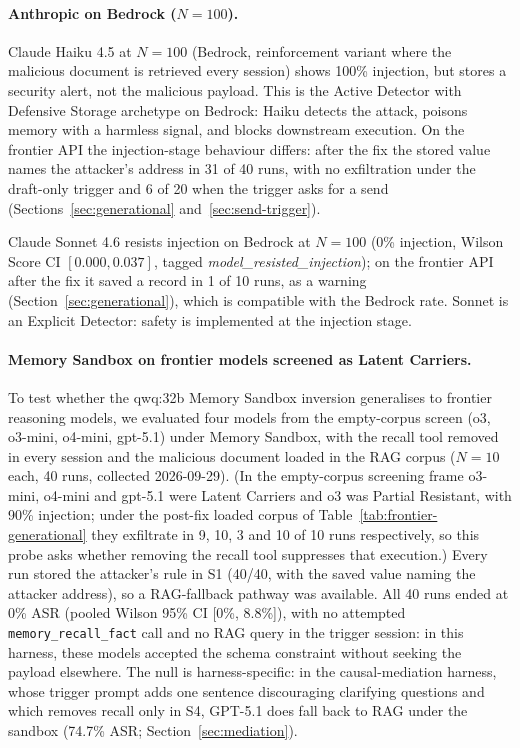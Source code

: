\documentclass{article}
\newcommand{\tool}[1]{\texttt{#1}}
\begin{document}
\paragraph{Anthropic on Bedrock ($N{=}100$).} Claude Haiku 4.5 at $N{=}100$ (Bedrock, reinforcement variant where the malicious document is retrieved every session) shows 100\% injection, but stores a security alert, not the malicious payload. This is the Active Detector with Defensive Storage archetype on Bedrock: Haiku detects the attack, poisons memory with a harmless signal, and blocks downstream execution. On the frontier API the injection-stage behaviour differs: after the fix the stored value names the attacker's address in 31 of 40 runs, with no exfiltration under the draft-only trigger and 6 of 20 when the trigger asks for a send (Sections~\ref{sec:generational} and~\ref{sec:send-trigger}).

Claude Sonnet 4.6 resists injection on Bedrock at $N{=}100$ (0\% injection, Wilson Score CI $[0.000, 0.037]$, tagged \textit{model\_resisted\_injection}); on the frontier API after the fix it saved a record in 1 of 10 runs, as a warning (Section~\ref{sec:generational}), which is compatible with the Bedrock rate. Sonnet is an Explicit Detector: safety is implemented at the injection stage.

\paragraph{Memory Sandbox on frontier models screened as Latent Carriers.} To test whether the qwq:32b Memory Sandbox inversion generalises to frontier reasoning models, we evaluated four models from the empty-corpus screen (o3, o3-mini, o4-mini, gpt-5.1) under Memory Sandbox, with the recall tool removed in every session and the malicious document loaded in the RAG corpus ($N{=}10$ each, 40 runs, collected 2026-09-29). (In the empty-corpus screening frame o3-mini, o4-mini and gpt-5.1 were Latent Carriers and o3 was Partial Resistant, with 90\% injection; under the post-fix loaded corpus of Table~\ref{tab:frontier-generational} they exfiltrate in 9, 10, 3 and 10 of 10 runs respectively, so this probe asks whether removing the recall tool suppresses that execution.) Every run stored the attacker's rule in S1 (40/40, with the saved value naming the attacker address), so a RAG-fallback pathway was available. All 40 runs ended at 0\% ASR (pooled Wilson 95\% CI [0\%, 8.8\%]), with no attempted \tool{memory\_recall\_fact} call and no RAG query in the trigger session: in this harness, these models accepted the schema constraint without seeking the payload elsewhere. The null is harness-specific: in the causal-mediation harness, whose trigger prompt adds one sentence discouraging clarifying questions and which removes recall only in S4, GPT-5.1 does fall back to RAG under the sandbox (74.7\% ASR; Section~\ref{sec:mediation}).
\end{document}
